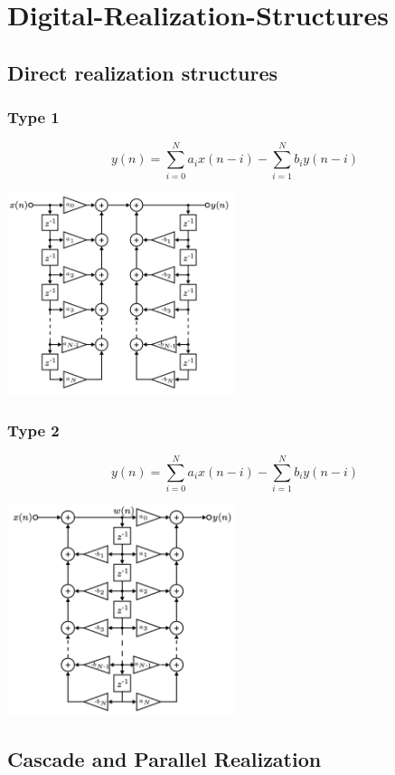 \section{Digital-Realization-Structures}
\subsection{Direct realization structures}
\subsubsection{Type 1}
$$y(n)=\sum_{i=0}^{N}a_{i}x(n-i)-\sum_{i=1}^{N}b_{i}y(n-i)$$
\begin{center}
  \includegraphics[width=0.5\textwidth]{Images/Type-1.png}
\end{center}
\subsubsection{Type 2}
$$y(n)=\sum_{i=0}^{N}a_{i}x(n-i)-\sum_{i=1}^{N}b_{i}y(n-i)$$
\begin{center}
  \includegraphics[width=0.5\textwidth]{Images/Type-2.png}
\end{center}
\subsection{Cascade and Parallel Realization}
